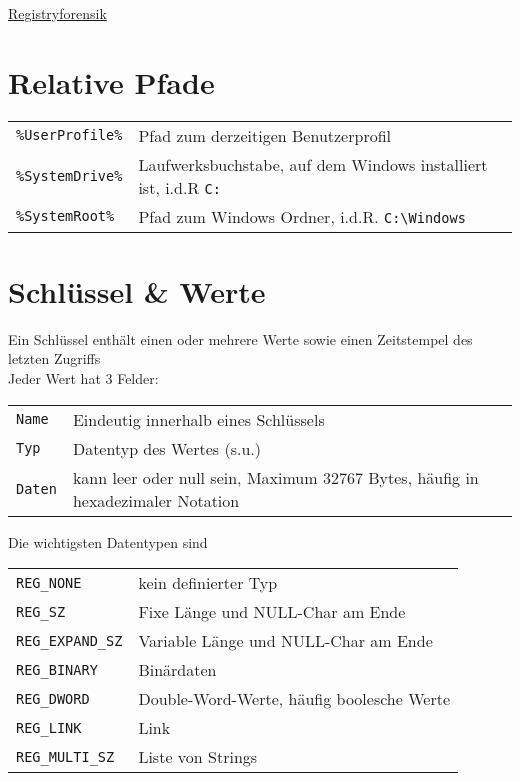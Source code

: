 \raggedright
\footnotesize
\begin{multicols}{3}	
	\setlength{\premulticols}{1pt}
	\setlength{\postmulticols}{1pt}
	\setlength{\multicolsep}{1pt}
	\setlength{\columnsep}{2pt}

\begin{center}
     \Large{\underline{Registryforensik}} \\
\end{center}

\section{Relative Pfade}
\begin{tabular}{@{}p{\the\MyLen}%
				@{}p{\linewidth-\the\MyLen}@{}}
\texttt{\%UserProfile\%} & Pfad zum derzeitigen Benutzerprofil \\
\texttt{\%SystemDrive\%} & Laufwerksbuchstabe, auf dem Windows 
							installiert ist, i.d.R \texttt{C:} \\
\texttt{\%SystemRoot\%} & Pfad zum Windows Ordner, i.d.R. \texttt{C:\textbackslash Windows}
\end{tabular}	

\section{Schlüssel \& Werte}
Ein Schlüssel enthält einen oder mehrere Werte sowie einen Zeitstempel des letzten Zugriffs\\
Jeder Wert hat 3 Felder:
\settowidth{\MyLen}{value.fields.}
\begin{tabular}{@{}p{\the\MyLen}%
		@{}p{\linewidth-\the\MyLen}@{}}
	\texttt{Name} & Eindeutig innerhalb eines Schlüssels\\
	\texttt{Typ} & Datentyp des Wertes (s.u.)\\
	\texttt{Daten} & kann leer oder null sein, Maximum 32767 Bytes, häufig in hexadezimaler Notation\\
\end{tabular}
Die wichtigsten Datentypen sind
\settowidth{\MyLen}{Reg.Expand.leng}
\begin{tabular}{@{}p{\the\MyLen}%
		@{}p{\linewidth-\the\MyLen}@{}}
	\texttt{REG\_NONE} & kein definierter Typ\\
	\texttt{REG\_SZ} & Fixe Länge und NULL-Char am Ende\\
	\texttt{REG\_EXPAND\_SZ} & Variable Länge und NULL-Char am Ende\\
	\texttt{REG\_BINARY} & Binärdaten\\
	\texttt{REG\_DWORD} & Double-Word-Werte, häufig boolesche Werte\\
	\texttt{REG\_LINK} & Link\\
	\texttt{REG\_MULTI\_SZ} & Liste von Strings\\
\end{tabular}



\end{multicols}
